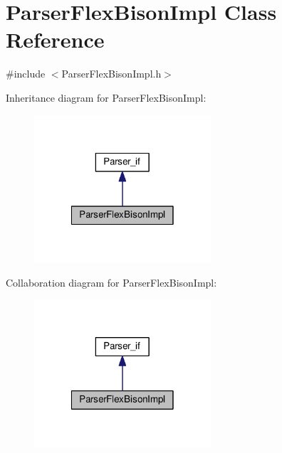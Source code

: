 \hypertarget{class_parser_flex_bison_impl}{\section{Parser\-Flex\-Bison\-Impl Class Reference}
\label{class_parser_flex_bison_impl}
}


{\ttfamily \#include $<$Parser\-Flex\-Bison\-Impl.\-h$>$}



Inheritance diagram for Parser\-Flex\-Bison\-Impl\-:\nopagebreak
\begin{figure}[H]
\begin{center}
\leavevmode
\includegraphics[width=186pt]{class_parser_flex_bison_impl__inherit__graph}
\end{center}
\end{figure}


Collaboration diagram for Parser\-Flex\-Bison\-Impl\-:\nopagebreak
\begin{figure}[H]
\begin{center}
\leavevmode
\includegraphics[width=186pt]{class_parser_flex_bison_impl__coll__graph}
\end{center}
\end{figure}
